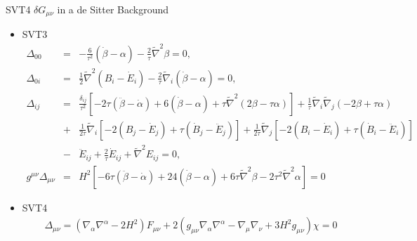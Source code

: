 \documentclass[8pt,aspectratio=1610]{beamer}
\begin{document}
\begin{frame}{SVT4 $\delta G_{\mu\nu}$ in a de Sitter Background}
	\begin{itemize}
		\item SVT3
			\begin{eqnarray}
			\Delta_{00}&=&-\frac{6}{\tau^2}(\dot{\beta}-\alpha)-\frac{2}{\tau}\tilde{\nabla}^2\beta=0,
			\nonumber\\
			\Delta_{0i}&=&\frac{1}{2}\tilde{\nabla}^2(B_i-\dot{E}_i)-\frac{2}{\tau}\tilde{\nabla}_i(\dot{\beta}-\alpha)=0,
			\nonumber\\
			\Delta_{ij}&=&\frac{\delta_{ij}}{\tau^2}\left[-2\tau(\ddot{\beta}-\dot{\alpha})+6(\dot{\beta}-\alpha)+\tau \tilde{\nabla}^2(2\beta-\tau \alpha)\right]
			+\frac{1}{\tau}\tilde{\nabla}_i\tilde{\nabla}_j(-2 \beta +\tau\alpha)
			\nonumber\\
			&+&\frac{1}{2\tau}\tilde{\nabla}_i[-2(B_j-\dot{E}_j)+\tau(\dot{B}_j-\ddot{E}_j)]
			+\frac{1}{2\tau}\tilde{\nabla}_j[-2(B_i-\dot{E}_i)+\tau(\dot{B}_i-\ddot{E}_i)]
			\nonumber\\
			&-&\ddot{E}_{ij}+\frac{2}{\tau}\dot{E}_{ij}+\tilde{\nabla}^2E_{ij}=0,
			\nonumber\\
			g^{\mu\nu}\Delta_{\mu\nu}&=&H^2[-6\tau(\ddot{\beta}-\dot{\alpha})+24(\dot{\beta}-\alpha)
			+6\tau \tilde{\nabla}^2\beta-2\tau^2\tilde{\nabla}^2\alpha]=0
			\end{eqnarray}
		\item SVT4
			\begin{eqnarray}
			\Delta_{\mu\nu} = (\nabla_{\alpha}\nabla^{\alpha}-2H^2)F_{\mu\nu}+2(g_{\mu\nu}\nabla_{\alpha}\nabla^{\alpha}-\nabla_{\mu}\nabla_{\nu}+3H^2g_{\mu\nu})\chi=0
			\end{eqnarray}
	\end{itemize}
\end{frame}

\end{document}
